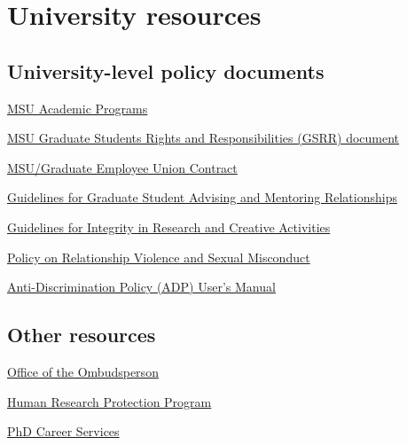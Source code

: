 \section{University resources}
\label{sec:resources}

\subsection{University-level policy documents}
\label{sec:resources_policy}


\vspace{3mm}
\noindent
\href{http://www.reg.msu.edu/ucc/ucc.asp}{MSU Academic Programs}

\vspace{3mm}
\noindent
\href{http://www.vps.msu.edu/SpLife/default.pdf}{MSU Graduate Students
  Rights and Responsibilities (GSRR) document}

\vspace{3mm}
\noindent
\href{https://www.hr.msu.edu/documents/contracts/GEU2015-2019.pdf}{MSU/Graduate
  Employee Union Contract}

\vspace{3mm}
\noindent
\href{https://grad.msu.edu/sites/default/files/content/researchintegrity/guidelines.pdf}{Guidelines for Graduate Student Advising and Mentoring Relationships}

\vspace{3mm}
\noindent
\href{https://grad.msu.edu/sites/default/files/content/researchintegrity/guidelines.pdf}{Guidelines for Integrity in Research and Creative Activities}

\vspace{3mm}
\noindent
\href{http://www.hr.msu.edu/documents/uwidepolproc/RVSM_Policy.htm}{Policy
  on Relationship Violence and Sexual Misconduct}


\vspace{3mm}
\noindent
\href{http://oie.msu.edu/policies-procedures-forms/documents/ADP\%20Users\%20Manual\%20-\%20updated\%2015.07.24.pdf}{Anti-Discrimination
                                Policy (ADP) User's Manual}

\subsection{Other resources}
\label{sec:resources_other}

\vspace{3mm}
\noindent
\href{http://www.msu.edu/unit/ombud/}{Office of the Ombudsperson}

\vspace{3mm}
\noindent
\href{http://hrpp.msu.edu/}{Human Research Protection Program}

\vspace{3mm}
\noindent
\href{https://grad.msu.edu/phdcareers}{PhD Career Services}
